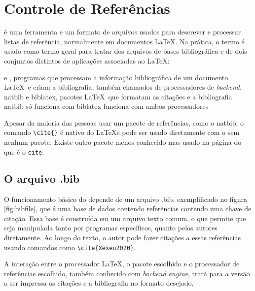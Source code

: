 \chapter{Controle de Referências}

 é uma ferramenta e um formato de arquivos usados para descrever e processar listas de referência,       normalmente em documentos \LaTeX  . Na prática, o termo  é usado como termo geral para tratar dos arquivos de bases bibliográfica e de dois conjuntos distintos de aplicações associadas ao \LaTeX:
\begin{outline}
    \1 \parencite{Patashnik:1988} e \parencite{Kime:2019a}, programas que
    processam a informação bibliográfica de um documento \LaTeX\ e criam a bibliografia, também chamados de processadores de \textit{backend}.
    \1 natbib\parencite{Daly:2010} e biblatex\parencite{Kime:2019}, pacotes \LaTeX\ que formatam as citações e a bibliografia
    \2 natbib só funciona com 
    \2 biblatex funciona com ambos processadores
\end{outline}

Apesar da maioria das pessoas usar um pacote de referências, como o natbib, o comando
\lstinline|\cite{}| é nativo do \LaTeX   e pode ser usado diretamente com o
 sem nenhum pacote. 
Existe outro pacote menos conhecido mas usado na página do  que é o \lstinline|cite|\parencite{Arseneau:2015}.

\section{O arquivo .bib}

O funcionamento básico do   depende de um arquivo .bib, exemplificado no figura \ref{fig:bibfile}, que é uma base de dados contendo  referências contendo uma chave de citação. Essa base é construída em um arquivo texto comum, o que permite que seja manipulada tanto por programas específicos, quanto pelos autores diretamente. Ao longo do texto, o autor pode fazer citações a essas referências usando comandos como \lstinline|\cite{Xexeo2020}|. 

A interação entre o processador \LaTeX, o pacote escolhido e o processador de referências escolhido, também conhecido com \textit{backend engine}, trará para a versão a ser impressa as citações e a bibliografia no formato desejado. 


